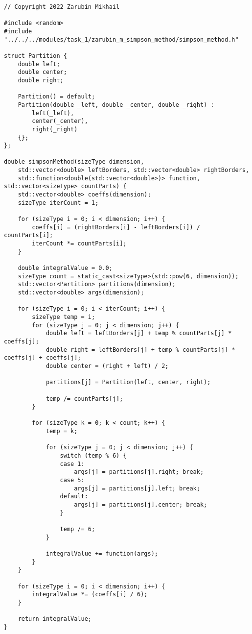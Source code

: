 \documentclass{report}
\begin{document}
\begin{lstlisting}
// Copyright 2022 Zarubin Mikhail

#include <random>
#include "../../../modules/task_1/zarubin_m_simpson_method/simpson_method.h"

struct Partition {
    double left;
    double center;
    double right;

    Partition() = default;
    Partition(double _left, double _center, double _right) :
        left(_left),
        center(_center),
        right(_right)
    {};
};

double simpsonMethod(sizeType dimension,
    std::vector<double> leftBorders, std::vector<double> rightBorders,
    std::function<double(std::vector<double>)> function, std::vector<sizeType> countParts) {
    std::vector<double> coeffs(dimension);
    sizeType iterCount = 1;

    for (sizeType i = 0; i < dimension; i++) {
        coeffs[i] = (rightBorders[i] - leftBorders[i]) / countParts[i];
        iterCount *= countParts[i];
    }

    double integralValue = 0.0;
    sizeType count = static_cast<sizeType>(std::pow(6, dimension));
    std::vector<Partition> partitions(dimension);
    std::vector<double> args(dimension);

    for (sizeType i = 0; i < iterCount; i++) {
        sizeType temp = i;
        for (sizeType j = 0; j < dimension; j++) {
            double left = leftBorders[j] + temp % countParts[j] * coeffs[j];
            double right = leftBorders[j] + temp % countParts[j] * coeffs[j] + coeffs[j];
            double center = (right + left) / 2;

            partitions[j] = Partition(left, center, right);

            temp /= countParts[j];
        }

        for (sizeType k = 0; k < count; k++) {
            temp = k;

            for (sizeType j = 0; j < dimension; j++) {
                switch (temp % 6) {
                case 1:
                    args[j] = partitions[j].right; break;
                case 5:
                    args[j] = partitions[j].left; break;
                default:
                    args[j] = partitions[j].center; break;
                }

                temp /= 6;
            }

            integralValue += function(args);
        }
    }

    for (sizeType i = 0; i < dimension; i++) {
        integralValue *= (coeffs[i] / 6);
    }

    return integralValue;
}

\end{lstlisting}
\end{document}
